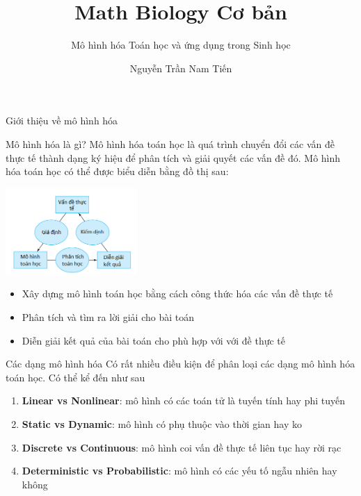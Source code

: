 \documentclass[pdf,aspectratio=169]{beamer}
\title{\textbf{Math Biology Cơ bản}}
\subtitle{Mô hình hóa Toán học và ứng dụng trong Sinh học}
\author{Nguyễn Trần Nam Tiến}
\date{}
\begin{document}
\begin{frame}
    \titlepage
\end{frame}

\begin{frame}[plain]
    \begin{center}
        \vspace{1cm}
        \Huge Giới thiệu về mô hình hóa
    \end{center}
\end{frame}

\begin{frame}{Mô hình hóa là gì?}
    Mô hình hóa toán học là quá trình chuyển đổi các vấn đề thực tế thành dạng ký hiệu để phân tích và giải quyết các vấn đề đó.
    Mô hình hóa toán học có thể được biểu diễn bằng đồ thị sau:
    \begin{center}
        \includegraphics[width=5cm]{figs/math_model.png}
    \end{center}
    \begin{itemize}
        \item Xây dựng mô hình toán học bằng cách công thức hóa các vấn đề thực tế
        \item Phân tích và tìm ra lời giải cho bài toán
        \item Diễn giải kết quả của bài toán cho phù hợp với với đề thực tế
    \end{itemize}
\end{frame}

\begin{frame}{Các dạng mô hình hóa}
    Có rất nhiều điều kiện để phân loại các dạng mô hình hóa toán học. Có thể kể đến như sau
    \begin{enumerate}
        \item \textbf{Linear vs Nonlinear}: mô hình có các toán tử là tuyến tính hay phi tuyến
        \item \textbf{Static vs Dynamic}: mô hình có phụ thuộc vào thời gian hay ko
        \item \textbf{Discrete vs Continuous}: mô hình coi vấn đề thực tế liên tục hay rời rạc
        \item \textbf{Deterministic vs Probabilistic}: mô hình có các yếu tố ngẫu nhiên hay không 
    \end{enumerate}
\end{frame}
\end{document}
